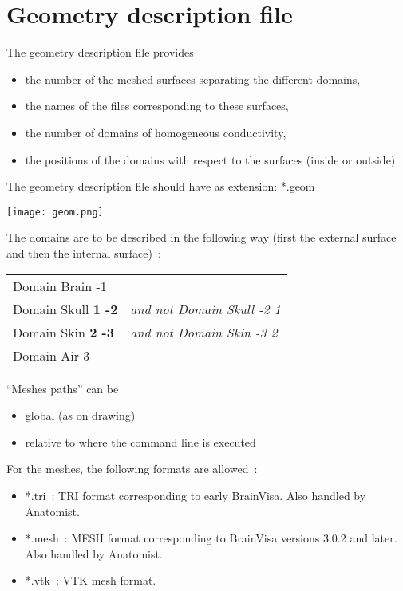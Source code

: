 \section{Geometry description file}
\label{sec:geom}
\noindent
The geometry description file provides
	\begin{itemize}
		\item the number of the meshed surfaces separating the different domains,
		\item  the names of the files corresponding to these surfaces,
		\item the number of domains of homogeneous conductivity,
		\item the positions of the domains with respect to the surfaces (inside or outside)
	\end{itemize}
The geometry description file should have as extension: *.geom

\centerline{\texttt{[image: geom.png]}}

\begin{note}
    	The domains are to be described in the following way (first the external surface and then the internal surface)~:

    \begin{tabular}{ll}
        Domain Brain -1              & \\
        Domain Skull \textbf{1 -2}	 &	\emph{and not Domain Skull -2 1} \\
        Domain Skin \textbf{2 -3}	 &	\emph{and not Domain Skin -3 2}  \\
        Domain Air 3                 &  \\
    \end{tabular}
\end{note}

\medskip

\begin{note}
    ``Meshes paths'' can be
    \begin{itemize}
        \item global (as on drawing)
        \item relative to where the command line is executed
    \end{itemize}
    For the meshes, the following formats are allowed~:
    \begin{itemize}
        \item *.tri~: TRI format corresponding to early BrainVisa. Also handled by Anatomist.
        \item *.mesh~: MESH format corresponding to BrainVisa versions 3.0.2 and later. Also handled by Anatomist.
        \item *.vtk~: VTK mesh format.
    \end{itemize}
\end{note}

